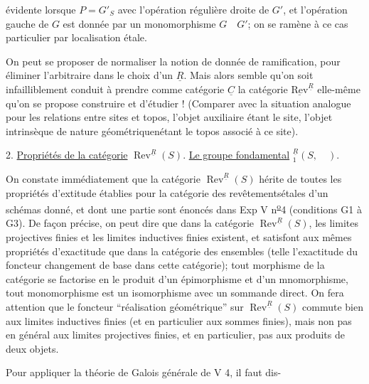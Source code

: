évidente lorsque $P=G'_S$ avec l'opération régulière droite de $G'$, et l'opération gauche de $G$ est donnée par un monomorphisme $G\quad G'$; on se ramène à ce cas particulier par localisation étale.

On peut se proposer de normaliser la notion de donnée de ramification, pour éliminer l'arbitraire dans le choix d'un $\underline{R}$. Mais alors  semble qu'on soit infailliblement conduit à prendre comme catégorie $\underline{C}$ la catégorie $\underline{\mathrm{Rev}}^{\underline{R}}$ elle-même qu'on se propose  construire et d'étudier ! (Comparer avec la situation analogue pour les relations entre sites et topos, l'objet auxiliaire étant le site, l'objet intrinsèque de nature géométriquenétant le topos associé à ce site).

2. \uline{Propriétés de la catégorie} $\operatorname{Rev}^{\underline{R}}(S)$. \uline{Le groupe fondamental} $ {}^{\underline{R}}_1(S,\quad)$.

On constate immédiatement que la catégorie $\operatorname{Rev}^{\underline{R}}(S)$ hérite de toutes les propriétés d'extitude  établies pour la catégorie des revêtementsétales d'un schémas donné, et dont une partie sont énoncés dans Exp V n\textsuperscript{\uline{o}}4 (conditions G1 à G3). De façon précise, on peut dire que dans la catégorie $\operatorname{Rev}^{\underline{R}}(S)$, les limites projectives finies et les limites inductives finies existent, et satisfont aux mêmes propriétés d'exactitude que dans la catégorie des ensembles (telle l'exactitude du foncteur changement de base dans cette catégorie);   tout morphisme de la catégorie se factorise en le produit d'un épimorphisme et d'un mnomorphisme,  tout monomorphisme est un isomorphisme avec un sommande direct. On fera attention que le foncteur ``réalisation géométrique'' sur $\operatorname{Rev}^{\underline{R}}(S)$ commute bien aux limites inductives finies (et  en particulier aux sommes finies), mais non pas en général aux limites projectives finies, et en particulier, pas aux produits de deux objets.

Pour appliquer la théorie de Galois générale de V 4, il faut dis-

